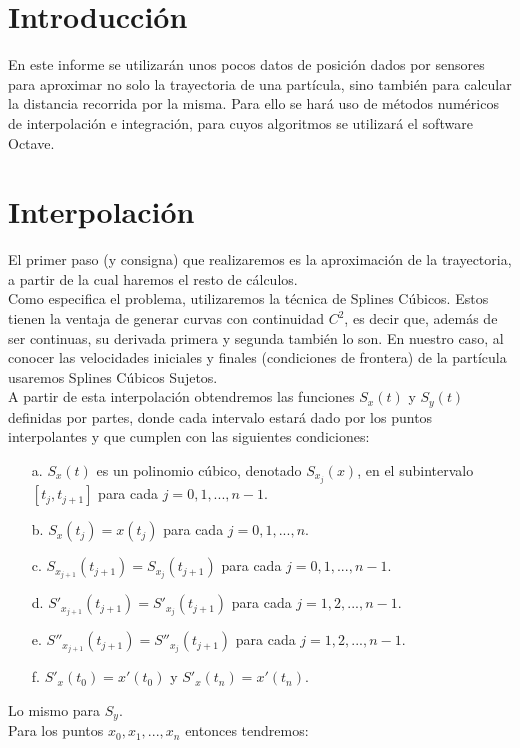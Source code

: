 \documentclass{article}
\begin{document}
    \section{Introducción}
    En este informe se utilizarán unos pocos datos de posición dados por sensores para aproximar no solo la trayectoria de una partícula, sino también para calcular la distancia recorrida por la misma. Para ello se hará uso de métodos numéricos de interpolación e integración, para cuyos algoritmos se utilizará el software Octave.

    \section{Interpolación}
    El primer paso (y consigna) que realizaremos es la aproximación de la trayectoria, a partir de la cual haremos el resto de cálculos.\\
    \indent Como especifica el problema, utilizaremos la técnica de Splines Cúbicos. Estos tienen la ventaja de generar curvas con continuidad \(C^2\), es decir que, además de ser continuas, su derivada primera y segunda también lo son. En nuestro caso, al conocer las velocidades iniciales y finales (condiciones de frontera) de la partícula usaremos Splines Cúbicos Sujetos. \\
    \indent A partir de esta interpolación obtendremos las funciones \(S_x(t)\) y \(S_y(t)\) definidas por partes, donde cada intervalo estará dado por los puntos interpolantes y que cumplen con las siguientes condiciones:
    \begin{enumerate}
        \item [a.] \(S_x(t)\) es un polinomio cúbico, denotado \(S_{x_j}(x)\), en el subintervalo \([t_j,t_{j+1}]\) para cada \(j=0,1,...,n-1\).
        \item [b.] \(S_x(t_j) = x(t_j)\) para cada \(j=0,1,...,n\).
        \item [c.] \(S_{x_{j+1}}(t_{j+1}) = S_{x_j}(t_{j+1})\) para cada \(j=0,1,...,n-1\).
        \item [d.] \(S'_{x_{j+1}}(t_{j+1}) = S'_{x_j}(t_{j+1})\) para cada \(j=1,2,...,n-1\).
        \item [e.] \(S''_{x_{j+1}}(t_{j+1}) = S''_{x_j}(t_{j+1})\) para cada \(j=1,2,...,n-1\).
        \item [f.] \(S'_x(t_0)=x'(t_0)\) y \(S'_x(t_n) = x'(t_n)\).
    \end{enumerate}
    Lo mismo para \(S_y\).\\
    \indent Para los puntos \(x_0,x_1,...,x_n\) entonces tendremos:
\end{document}
